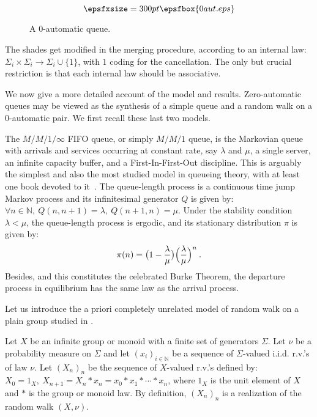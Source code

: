\documentclass[11pt,a4paper]{article}
\theoremstyle{remark}
\def\Blackboardfont{\mathbb}
\def\N{{\Blackboardfont N}}
\begin{document}
\begin{figure}[ht]
\[ \epsfxsize=300pt \epsfbox{0aut.eps} \]
\caption{A 0-automatic queue.}
\label{fi-0aut}
\end{figure}

The shades get modified in the merging procedure, according
to an internal law: $\Sigma_i \times \Sigma_i \rightarrow \Sigma_i\cup
\{1\}$, with $1$ coding for the cancellation.
The only but crucial restriction is that each internal law should
be associative.

\medskip

We now give a more detailed account of the model and
results. Zero-automatic queues may be viewed as the synthesis of a
simple queue and a random walk on a 0-automatic pair. We first
recall these last two models.

The $M/M/1/\infty$ FIFO queue, or simply $M/M/1$ queue, is the
Markovian queue with arrivals and services occurring at constant
rate, say $\lambda$ and $\mu$, a single server, an infinite
capacity buffer, and a First-In-First-Out discipline. This is
arguably the simplest and also the most studied model in queueing
theory, with at least one book devoted to it~\cite{cohe82}. The
queue-length process is a continuous time jump Markov process and
its infinitesimal generator $Q$ is given by: $\forall n\in \N, \
Q(n,n+1)=\lambda, \ Q(n+1,n)=\mu$. Under the stability condition
$\lambda<\mu$, the queue-length process is ergodic, and its
stationary distribution $\pi$ is given by:
\begin{equation}\label{eq-mm1}
\pi(n) = \bigl(1-\frac{\lambda}{\mu} \bigr) \Bigl(\frac{\lambda}{\mu}\Bigr)^n \:.
\end{equation}
Besides, and this constitutes the celebrated Burke Theorem, the
departure process in equilibrium has the same law as the arrival
process.


\medskip

Let us introduce the a priori completely unrelated model of random
walk on a plain group studied in \cite{mair04,MaMa}.

Let $X$ be an infinite group or monoid with a finite set of
generators $\Sigma$. Let $\nu$ be a probability measure on $\Sigma$
and let $(x_i)_{i\in
  \N}$ be a sequence of $\Sigma$-valued i.i.d. r.v.'s of law $\nu$.
Let $(X_n)_n$ be the sequence of $X$-valued r.v.'s defined by:
$X_0=1_X, \ X_{n+1}= X_n\ast x_n = x_0\ast x_{1}\ast \cdots
\ast x_n$,
where $1_X$ is the unit element of $X$ and $\ast$ is the group or
monoid law. By definition, $(X_n)_n$ is a realization of the
random walk $(X,\nu)$.
\end{document}
